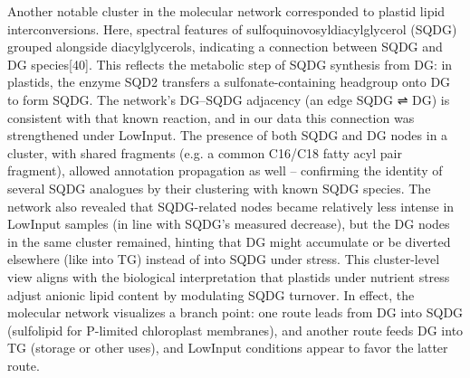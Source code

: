 \documentclass[10pt,letterpaper]{article}
\begin{document}
\begin{itemize}
Another notable cluster in the molecular network corresponded to plastid lipid interconversions. Here, spectral features of sulfoquinovosyldiacylglycerol (SQDG) grouped alongside diacylglycerols, indicating a connection between SQDG and DG species[40]. This reflects the metabolic step of SQDG synthesis from DG: in plastids, the enzyme SQD2 transfers a sulfonate-containing headgroup onto DG to form SQDG. The network’s DG–SQDG adjacency (an edge SQDG ⇌ DG) is consistent with that known reaction, and in our data this connection was strengthened under LowInput. The presence of both SQDG and DG nodes in a cluster, with shared fragments (e.g. a common C16/C18 fatty acyl pair fragment), allowed annotation propagation as well – confirming the identity of several SQDG analogues by their clustering with known SQDG species. The network also revealed that SQDG-related nodes became relatively less intense in LowInput samples (in line with SQDG’s measured decrease), but the DG nodes in the same cluster remained, hinting that DG might accumulate or be diverted elsewhere (like into TG) instead of into SQDG under stress. This cluster-level view aligns with the biological interpretation that plastids under nutrient stress adjust anionic lipid content by modulating SQDG turnover. In effect, the molecular network visualizes a branch point: one route leads from DG into SQDG (sulfolipid for P-limited chloroplast membranes), and another route feeds DG into TG (storage or other uses), and LowInput conditions appear to favor the latter route.

\end{itemize}
\end{document}
